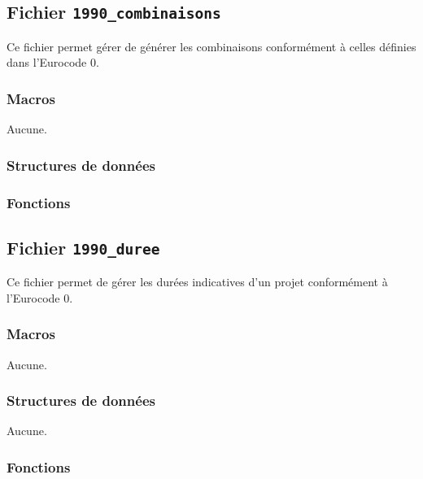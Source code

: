 \documentclass{article}
\begin{document}
\subsection{Fichier {\texttt{1990\_combinaisons}}}
Ce fichier permet gérer de générer les combinaisons conformément à celles définies dans l'Eurocode 0.
\subsubsection{Macros}
Aucune.
\subsubsection{Structures de données}



\subsubsection{Fonctions}












\subsection{Fichier {\texttt{1990\_duree}}}
Ce fichier permet de gérer les durées indicatives d'un projet conformément à l'Eurocode 0.
\subsubsection{Macros}
Aucune.
\subsubsection{Structures de données}
Aucune.
\subsubsection{Fonctions}












\end{document}
